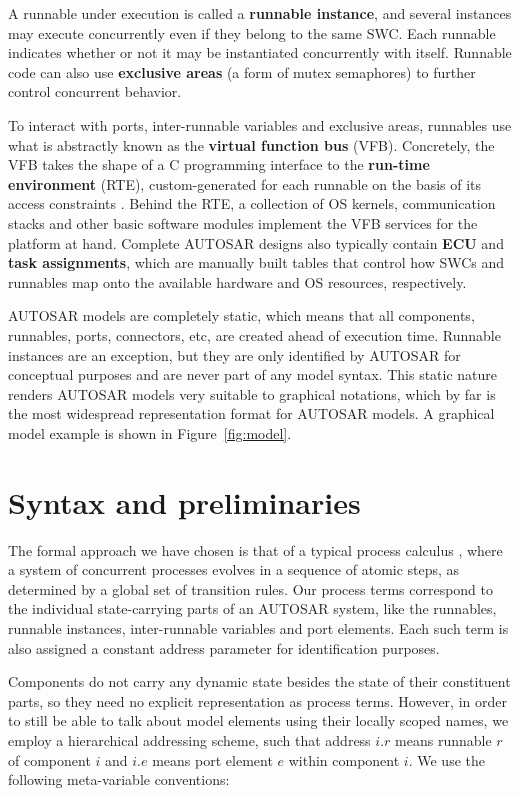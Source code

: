 \documentclass[10pt,conference]{IEEEtran}
\begin{document}
A runnable under execution is called a \textbf{runnable instance}, and several instances may execute concurrently even if they belong to the same SWC. Each runnable indicates whether or not it may be instantiated concurrently with itself. Runnable code can also use \textbf{exclusive areas} (a form of mutex semaphores) to further control concurrent behavior.

To interact with ports, inter-runnable variables and exclusive areas, runnables use what is abstractly known as the \textbf{virtual function bus} (VFB). Concretely, the VFB takes the shape of a C programming interface to the \textbf{run-time environment} (RTE), custom-generated for each runnable on the basis of its access constraints \cite{AR:RTE}. Behind the RTE, a collection of OS kernels, communication stacks and other basic software modules implement the VFB services for the platform at hand. Complete AUTOSAR designs also typically contain \textbf{ECU} and \textbf{task assignments}, which are manually built tables that control how SWCs and runnables map onto the available hardware and OS resources, respectively.

AUTOSAR models are completely static, which means that all components, runnables, ports, connectors, etc, are created ahead of execution time. Runnable instances are an exception, but they are only identified by AUTOSAR for conceptual purposes and are never part of any model syntax. This static nature renders AUTOSAR models very suitable to graphical notations, which by far is the most widespread representation format for AUTOSAR models. A graphical model example is shown in Figure~\ref{fig:model}.


\section{Syntax and preliminaries}
\label{sec:Calc}

The formal approach we have chosen is that of a typical process calculus \cite{milner:ComMob}, where a system of concurrent processes evolves in a sequence of atomic steps, as determined by a global set of transition rules. Our process terms correspond to the individual state-carrying parts of an AUTOSAR system, like the runnables, runnable instances, inter-runnable variables and port elements. Each such term is also assigned a constant address parameter for identification purposes.

Components do not carry any dynamic state besides the state of their constituent parts, so they need no explicit representation as process terms. However, in order to still be able to talk about model elements using their locally scoped names, we employ a hierarchical addressing scheme, such that address $i.r$ means runnable $r$ of component $i$ and $i.e$ means port element $e$ within component $i$. We use the following meta-variable conventions:
\end{document}
